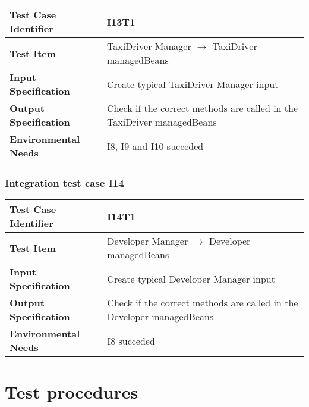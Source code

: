 \begin{table}[!htbp]
\begin{center}
\begin{tabular}[t]{p{}p{}}

\hline
\textbf{Test Case Identifier} & I13T1 \\
\hline
\textbf{Test Item} & TaxiDriver Manager $\rightarrow$ TaxiDriver managedBeans \\
\hline
\textbf{Input Specification} & Create typical TaxiDriver Manager input  \\
\hline
\textbf{Output Specification} & Check if the correct methods are called in the TaxiDriver managedBeans \\
\hline
\textbf{Environmental Needs} & I8, I9 and I10 succeded \\
\hline

\end{tabular}
\end{center}
\end{table}
\clearpage


\subsubsection{Integration test case I14}

\begin{table}[!htbp]
\begin{center}
\begin{tabular}[t]{p{}p{}}

\hline
\textbf{Test Case Identifier} & I14T1 \\
\hline
\textbf{Test Item} & Developer Manager $\rightarrow$ Developer managedBeans \\
\hline
\textbf{Input Specification} & Create typical Developer Manager input  \\
\hline
\textbf{Output Specification} & Check if the correct methods are called in the Developer managedBeans \\
\hline
\textbf{Environmental Needs} & I8 succeded \\
\hline

\end{tabular}
\end{center}
\end{table}
\clearpage



\section{Test procedures}

